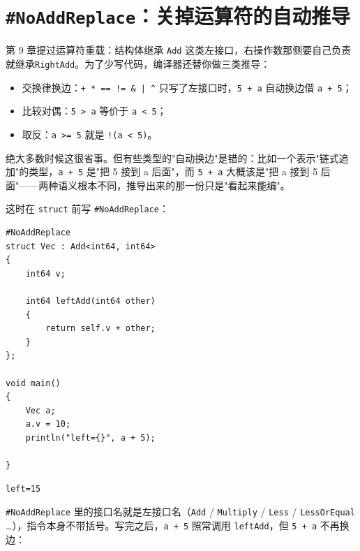 \section{\texttt{\#No\allowbreak{}Add\allowbreak{}Replace}：关掉运算符的自动推导}

第 9 章提过运算符重载：结构体继承 \texttt{Add} 这类左接口，右操作数那侧要自己负责就继承\texttt{Right\allowbreak{}Add}。为了少写代码，编译器还替你做三类推导：

\begin{itemize}

\item 交换律换边：\texttt{+ * =\allowbreak{}=\allowbreak{} !=\allowbreak{} \& | \textasciicircum{}} 只写了左接口时，\texttt{5 + a} 自动换边借 \texttt{a + 5}；

\item 比较对偶：\texttt{5 >\allowbreak{} a} 等价于 \texttt{a <\allowbreak{} 5}；

\item 取反：\texttt{a >\allowbreak{}=\allowbreak{} 5} 就是 \texttt{!(\allowbreak{}a <\allowbreak{} 5)\allowbreak{}}。

\end{itemize}

绝大多数时候这很省事。但有些类型的"自动换边"是错的：比如一个表示"链式追加"的类型，\texttt{a + 5} 是"把 5 接到 a 后面"，而 \texttt{5 + a} 大概该是"把 a 接到 5 后面"——两种语义根本不同，推导出来的那一份只是"看起来能编"。

这时在 \texttt{struct} 前写 \texttt{\#No\allowbreak{}Add\allowbreak{}Replace}：

\par
\medskip
\begin{lstlisting}[style=chali]
#NoAddReplace
struct Vec : Add<int64, int64>
{
    int64 v;

    int64 leftAdd(int64 other)
    {
        return self.v + other;
    }
};

void main()
{
    Vec a;
    a.v = 10;
    println("left={}", a + 5);

}
\end{lstlisting}
\par
\medskip

\par
\medskip
\begin{lstlisting}[style=out]
left=15
\end{lstlisting}
\par
\medskip

\texttt{\#No\allowbreak{}Add\allowbreak{}Replace} 里的接口名就是左接口名（\texttt{Add} / \texttt{Multiply} / \texttt{Less} / \texttt{Less\allowbreak{}Or\allowbreak{}Equal} …），指令本身不带括号。写完之后，\texttt{a + 5} 照常调用 \texttt{left\allowbreak{}Add}，但 \texttt{5 + a} 不再换边：

